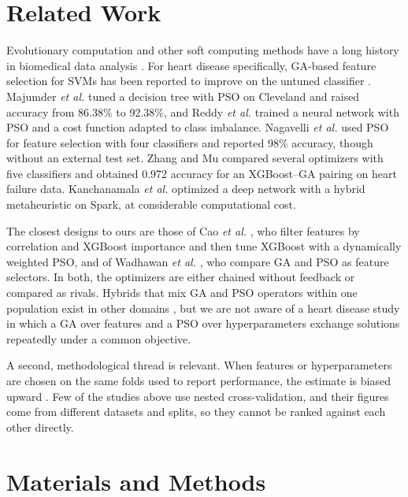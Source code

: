 \documentclass[conference]{IEEEtran}
\begin{document}
\section{Related Work}
Evolutionary computation and other soft computing methods have a long history in biomedical data analysis \cite{slowik2020ea,houssein2023softcomputing,yardimci2009medicine}. For heart disease specifically, GA-based feature selection for SVMs has been reported to improve on the untuned classifier \cite{warsi2024gasvm,effective2021gasvm}. Majumder \emph{et al.} \cite{majumder2025psodt} tuned a decision tree with PSO on Cleveland and raised accuracy from 86.38\% to 92.38\%, and Reddy \emph{et al.} \cite{reddy2025psonn} trained a neural network with PSO and a cost function adapted to class imbalance. Nagavelli \emph{et al.} \cite{nagavelli2024pso} used PSO for feature selection with four classifiers and reported 98\% accuracy, though without an external test set. Zhang and Mu \cite{zhang2024xgga} compared several optimizers with five classifiers and obtained 0.972 accuracy for an XGBoost--GA pairing on heart failure data. Kanchanamala \emph{et al.} \cite{kanchanamala2023spark} optimized a deep network with a hybrid metaheuristic on Spark, at considerable computational cost.

The closest designs to ours are those of Cao \emph{et al.} \cite{cao2025dlpso}, who filter features by correlation and XGBoost importance and then tune XGBoost with a dynamically weighted PSO, and of Wadhawan \emph{et al.} \cite{wadhawan2026gavspso}, who compare GA and PSO as feature selectors. In both, the optimizers are either chained without feedback or compared as rivals. Hybrids that mix GA and PSO operators within one population exist in other domains \cite{juang2004gapso}, but we are not aware of a heart disease study in which a GA over features and a PSO over hyperparameters exchange solutions repeatedly under a common objective.

A second, methodological thread is relevant. When features or hyperparameters are chosen on the same folds used to report performance, the estimate is biased upward \cite{varma2006bias,cawley2010overfitting}. Few of the studies above use nested cross-validation, and their figures come from different datasets and splits, so they cannot be ranked against each other directly.

\section{Materials and Methods}
\end{document}
